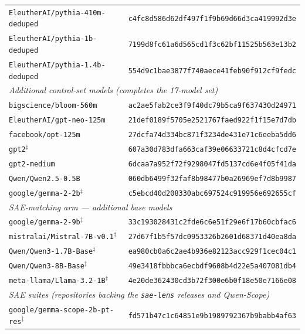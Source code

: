 \begin{table}[h]
\begin{tabular}{ll}
\texttt{EleutherAI/pythia-410m-deduped}  & \texttt{c4fc8d586d62df497f1f9b69d66d3ca419992d3e} \\
\texttt{EleutherAI/pythia-1b-deduped}    & \texttt{7199d8fc61a6d565cd1f3c62bf11525b563e13b2} \\
\texttt{EleutherAI/pythia-1.4b-deduped}  & \texttt{554d9c1bae3877f740aece41feb90f912cf9fedc} \\
\midrule
\multicolumn{2}{l}{\textit{Additional control-set models (completes the 17-model set)}} \\
\texttt{bigscience/bloom-560m}           & \texttt{ac2ae5fab2ce3f9f40dc79b5ca9f637430d24971} \\
\texttt{EleutherAI/gpt-neo-125m}         & \texttt{21def0189f5705e2521767faed922f1f15e7d7db} \\
\texttt{facebook/opt-125m}               & \texttt{27dcfa74d334bc871f3234de431e71c6eeba5dd6} \\
\texttt{gpt2}$^{\ddagger}$               & \texttt{607a30d783dfa663caf39e06633721c8d4cfcd7e} \\
\texttt{gpt2-medium}                     & \texttt{6dcaa7a952f72f9298047fd5137cd6e4f05f41da} \\
\texttt{Qwen/Qwen2.5-0.5B}               & \texttt{060db6499f32faf8b98477b0a26969ef7d8b9987} \\
\texttt{google/gemma-2-2b}$^{\ddagger}$  & \texttt{c5ebcd40d208330abc697524c919956e692655cf} \\
\midrule
\multicolumn{2}{l}{\textit{SAE-matching arm --- additional base models}} \\
\texttt{google/gemma-2-9b}$^{\ddagger}$        & \texttt{33c193028431c2fde6c6e51f29e6f17b60cbfac6} \\
\texttt{mistralai/Mistral-7B-v0.1}$^{\ddagger}$ & \texttt{27d67f1b5f57dc0953326b2601d68371d40ea8da} \\
\texttt{Qwen/Qwen3-1.7B-Base}$^{\ddagger}$     & \texttt{ea980cb0a6c2ae4b936e82123acc929f1cec04c1} \\
\texttt{Qwen/Qwen3-8B-Base}$^{\ddagger}$       & \texttt{49e3418fbbbca6ecbdf9608b4d22e5a407081db4} \\
\texttt{meta-llama/Llama-3.2-1B}$^{\ddagger}$  & \texttt{4e20de362430cd3b72f300e6b0f18e50e7166e08} \\
\midrule
\multicolumn{2}{l}{\textit{SAE suites (repositories backing the \texttt{sae-lens} releases and Qwen-Scope)}} \\
\texttt{google/gemma-scope-2b-pt-res}$^{\ddagger}$ & \texttt{fd571b47c1c64851e9b1989792367b9babb4af63} \\

\end{tabular}
\end{table}
